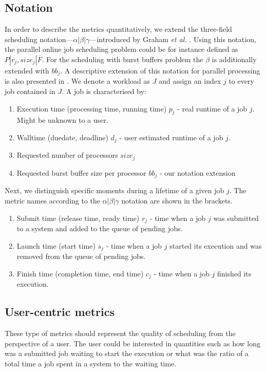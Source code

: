 \documentclass[thesis-en.tex]{subfiles}
\begin{document}
\subsection{Notation} \label{sec:notation}
In order to describe the metrics quantitatively, we extend the three-field scheduling notation---$\alpha|\beta|\gamma$---introduced by Graham \textit{et al.} \cite{GRAHAM1979287}. Using this notation, the parallel online job scheduling problem could be for instance defined as $P|r_j,size_j|\overline{F}$. For the scheduling with burst buffers problem the $\beta$ is additionally extended with $bb_j$. A descriptive extension of this notation for parallel processing is also presented in \cite{drozdowski2009scheduling}. We denote a workload as $J$ and assign an index $j$ to every job contained in $J$. A job is characterised by:
\begin{enumerate}
\item Execution time (processing time, running time) $p_j$ - real runtime of a job $j$. Might be unknown to a user.
\item Walltime (duedate, deadline) $d_j$ - user estimated runtime of a job $j$.
\item Requested number of processors $size_j$
\item Requested burst buffer size per processor $bb_j$ - our notation extension
\end{enumerate}

Next, we distinguish specific moments during a lifetime of a given job $j$. The metric names according to the $\alpha|\beta|\gamma$ notation are shown in the brackets.
\begin{enumerate}
\item Submit time (release time, ready time) $r_j$ - time when a job $j$ was submitted to a system and added to the queue of pending jobs.
\item Launch time (start time) $s_j$ - time when a job $j$ started its execution and was removed from the queue of pending jobs.
\item Finish time (completion time, end time) $c_j$ - time when a job $j$ finished its execution.
\end{enumerate}

\subsection{User-centric metrics}
These type of metrics should represent the quality of scheduling from the perspective of a user. The user could be interested in quantities such as how long was a submitted job waiting to start the execution or what was the ratio of a total time a job spent in a system to the waiting time.
\end{document}
